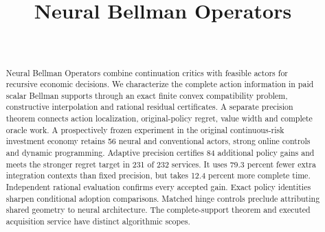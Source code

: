 \documentclass[ecta,nameyear,draft]{econsocart}
\begin{document}
\begin{frontmatter}
\title{Neural Bellman Operators}
\begin{aug}
\author[id=au1,addressref={add1}]{~}
\address[id=add1]{Peking University}
\end{aug}
\begin{abstract}
Neural Bellman Operators combine continuation critics with feasible actors for
recursive economic decisions. We characterize the complete action information
in paid scalar Bellman supports through an exact finite convex compatibility
problem, constructive interpolation and rational residual certificates. A
separate precision theorem connects action localization, original-policy regret,
value width and complete oracle work. A prospectively frozen experiment in the
original continuous-risk investment economy retains 56 neural and conventional
actors, strong online controls and dynamic programming. Adaptive precision
certifies 84 additional policy gains and meets the stronger regret target in
231 of 232 services. It uses 79.3 percent fewer extra integration contexts than
fixed precision, but takes 12.4 percent more complete time. Independent rational
evaluation confirms every accepted gain. Exact policy identities sharpen
conditional adoption comparisons. Matched hinge controls preclude attributing
shared geometry to neural architecture. The complete-support theorem and
executed acquisition service have distinct algorithmic scopes.
\end{abstract}
\begin{keyword}
\end{keyword}
\end{frontmatter}












\begingroup
\let\NBOBibliographyStart\thebibliography
\renewcommand{\thebibliography}[1]{\NBOBibliographyStart{#1}\raggedright}

\endgroup
\end{document}
